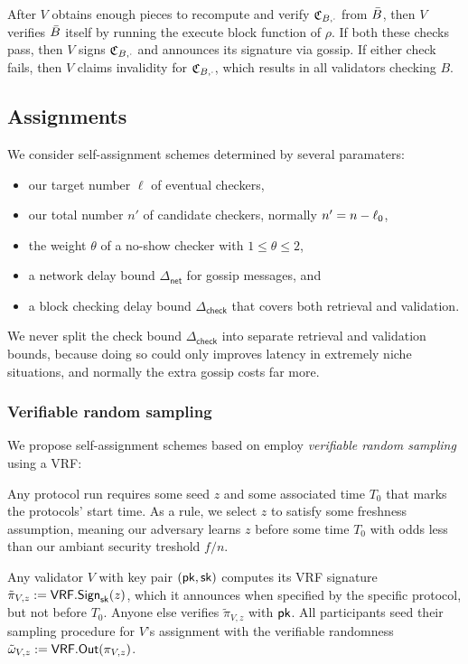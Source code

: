 After $V$ obtains enough pieces to recompute and verify $\mathfrak{C}_{B,\cdot}$ from $\bar{B}$, then $V$ verifies $\bar{B}$ itself by running the execute block function of $\rho$.  If both these checks pass, then $V$ signs $\mathfrak{C}_{B,\cdot}$ and announces its signature via gossip.  If either check fails, then $V$ claims invalidity for $\mathfrak{C}_{B,\cdot}$, which results in all validators checking $B$.


\subsection{Assignments}
\label{sec:assignment}

\newcommand\netdelay{\ensuremath{\Delta_{\mathsf{net}}}}
\newcommand\checkdelay{\ensuremath{\Delta_{\mathsf{check}}}}

We consider self-assignment schemes determined by several paramaters:
\begin{itemize}
\item our target number $\ell$ of eventual checkers,
\item our total number $n'$ of candidate checkers, normally $n' = n - \ell_0$,
\item the weight $\theta$ of a no-show checker with $1 \leq \theta \leq 2$,
\item a network delay bound $\netdelay$ for gossip messages, and
\item a block checking delay bound $\checkdelay$ that covers both retrieval and validation.
\end{itemize}
We never split the check bound $\checkdelay$ into separate retrieval and validation bounds, because doing so could only improves latency in extremely niche situations, and normally the extra gossip costs far more. 

\subsubsection{Verifiable random sampling}

We propose self-assignment schemes based on employ {\em verifiable random sampling} using a VRF:  

Any protocol run requires some seed $z$ and some associated time $T_0$ that marks the protocols' start time.  As a rule, we select $z$ to satisfy some freshness assumption, meaning our adversary learns $z$ before some time $T_0$ with odds less than our ambiant security treshold $f/n$.

Any validator $V$ with key pair $(\mathsf{pk},\mathsf{sk})$ computes its VRF signature $\tilde{\pi}_{V,z} := \mathsf{VRF}.\mathsf{Sign}_{\mathsf{sk}}(z)$, which it announces when specified by the specific protocol, but not before $T_0$.  Anyone else verifies $\tilde{\pi}_{V,z}$ with $\mathsf{pk}$.  All participants seed their sampling procedure for $V$'s assignment with the verifiable randomness $\tilde{\omega}_{V,z} := \mathsf{VRF}.\mathsf{Out}(\pi_{V,z})$.

